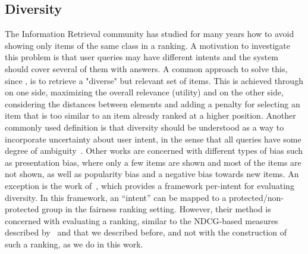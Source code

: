 \subsection{Diversity}

The Information Retrieval community has studied for many years how to avoid showing only items of the same class in a ranking. A motivation to investigate this problem is that user queries may have different intents and the system should cover several of them with answers.
%
A common approach to solve this, since \citet{carbonell1998use}, is to retrieve a "diverse" but relevant set of items. This is achieved through on one side, maximizing the overall relevance (utility) and on the other side, considering the distances between elements and adding a penalty for selecting an item that is too similar to an item already ranked at a higher position.
%
Another commonly used definition is that diversity should be understood as a way to incorporate uncertainty about user intent, in the sense that all queries have some degree of ambiguity~\cite{agrawal2009diversifying}.
%
Other works \citet{kunaver2017diversity,channamsetty2017recommender} are concerned with different types of bias such as presentation bias, where only a few items are shown and most of the items are not shown, as well as popularity bias and a negative bias towards new items.
%
An exception is the work of~\citet{sakai2011evaluating}, which provides a framework per-intent for evaluating diversity. In this framework, an ``intent'' can be mapped to a protected/non-protected group in the fairness ranking setting. However, their method is concerned with evaluating a ranking, similar to the NDCG-based measures described by~\citet{yang2016measuring} and that we described before, and not with the construction of such a ranking, as we do in this work.

